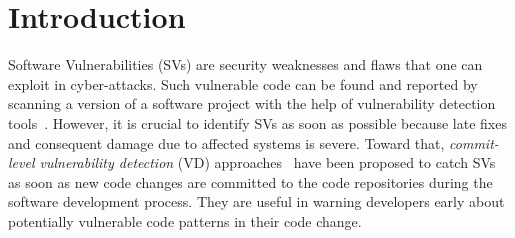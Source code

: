 \section{Introduction}
\label{intro:sec}


Software Vulnerabilities (SVs) are security weaknesses and flaws that one can exploit in cyber-attacks. 
Such vulnerable code can be found and reported by scanning a version of a software project with the help of vulnerability detection tools~\cite{li2018vuldeepecker,zhou2019devign,li2021sysevr}.
However, it is crucial to identify SVs as 
soon as possible because late fixes and consequent damage due to affected systems is severe.
Toward that, {\em commit-level vulnerability
  detection} (VD)
approaches~\cite{perl2015vccfinder,zhou2017automated,chen2019large}
have been proposed to catch SVs as soon as new code changes are
committed to the code repositories during 
the software development process. They are useful in warning developers early about potentially vulnerable code patterns in their code change.


